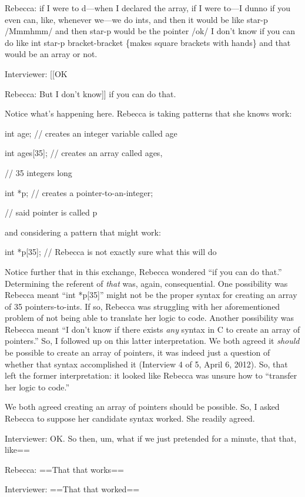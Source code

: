 Rebecca: if I were to d---when I declared the array, if I were to---I
dunno if you even can, like, whenever we---we do ints, and then it would
be like star-p /Mmmhmm/ and then star-p would be the pointer /ok/ I
don't know if you can do like int star-p
\textbar{}\textbar{}bracket-bracket\textbar{}\textbar{}
\textbar{}\{makes square brackets with hands\}\textbar{} and that would
be an array or not.

Interviewer: {[}{[}OK

Rebecca: But I don't know{]}{]} if you can do that.

Notice what's happening here. Rebecca is taking patterns that she knows
work:

int age; // creates an integer variable called age

int ages{[}35{]}; // creates an array called ages,

// 35 integers long

int *p; // creates a pointer-to-an-integer;

// said pointer is called p

and considering a pattern that might work:

int *p{[}35{]}; // Rebecca is not exactly sure what this will do

Notice further that in this exchange, Rebecca wondered ``if you can do
that.'' Determining the referent of \emph{that} was, again,
consequential. One possibility was Rebecca meant ``int *p{[}35{]}''
might not be the proper syntax for creating an array of 35
pointers-to-ints. If so, Rebecca was struggling with her aforementioned
problem of not being able to translate her logic to code. Another
possibility was Rebecca meant ``I don't know if there exists \emph{any}
syntax in C to create an array of pointers.'' So, I followed up on this
latter interpretation. We both agreed it \emph{should} be possible to
create an array of pointers, it was indeed just a question of whether
that syntax accomplished it (Interview 4 of 5, April 6, 2012). So, that
left the former interpretation: it looked like Rebecca was unsure how to
``transfer her logic to code.''

We both agreed creating an array of pointers should be possible. So, I
asked Rebecca to suppose her candidate syntax worked. She readily
agreed.

Interviewer: OK. So then, um, what if we just pretended for a minute,
that that, like==

Rebecca: ==That that works==

Interviewer: ==That that worked==

